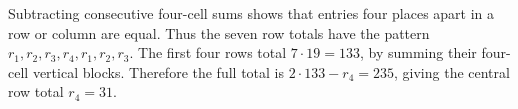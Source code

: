 Subtracting consecutive four-cell sums shows that entries four places apart in a row or column are equal. Thus the seven row totals have the pattern $r_1,r_2,r_3,r_4,r_1,r_2,r_3$. The first four rows total $7\cdot19=133$, by summing their four-cell vertical blocks. Therefore the full total is $2\cdot133-r_4=235$, giving the central row total $\boxed{r_4=31}$.
